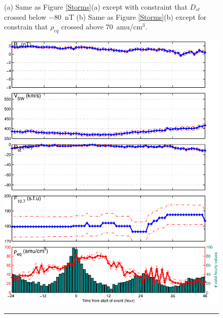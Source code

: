 \documentclass[10pt,twocolumn]{article}
\begin{document}
\begin{figure}[tp!]
\caption{(a) Same as Figure \ref{Storms}(a) except with constraint that $D_{st}$ crossed below $-80$~nT (b) Same as Figure \ref{Storms}(b) except for constrain that $\rho_{eq}$ crossed above $70$~amu/cm$^3$.}
\label{Dspec}
\end{figure}

\begin{figure}[tp!]
\centering
\includegraphics[scale=0.40]{paperfigures/stormavs-diffden-10amu.eps}
\rule[1ex]{5cm}{1pt}

\end{figure}
\end{document}
